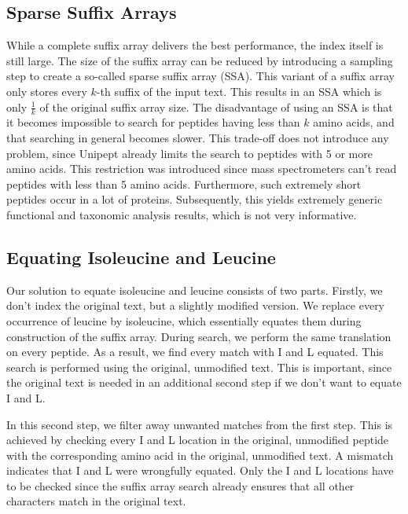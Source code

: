 \documentclass[11pt]{article}
\begin{document}
\begin{multicols}{2}
        \subsection{Sparse Suffix Arrays}
        While a complete suffix array delivers the best performance, the index itself is still large.
        The size of the suffix array can be reduced by introducing a sampling step to create a so-called sparse suffix array (SSA).
        This variant of a suffix array only stores every $k$-th suffix of the input text.
        This results in an SSA which is only $\frac{1}{k}$ of the original suffix array size.
        The disadvantage of using an SSA is that it becomes impossible to search for peptides having less than $k$ amino acids, and that searching in general becomes slower.
        This trade-off does not introduce any problem, since Unipept already limits the search to peptides with 5 or more amino acids.
        This restriction was introduced since mass spectrometers can't read peptides with less than 5 amino acids.
        Furthermore, such extremely short peptides occur in a lot of proteins.
        Subsequently, this yields extremely generic functional and taxonomic analysis results, which is not very informative.

        \subsection{Equating Isoleucine and Leucine}
        Our solution to equate isoleucine and leucine consists of two parts.
        Firstly, we don't index the original text, but a slightly modified version.
        We replace every occurrence of leucine by isoleucine, which essentially equates them during construction of the suffix array.
        During search, we perform the same translation on every peptide.
        As a result, we find every match with I and L equated.
        This search is performed using the original, unmodified text.
        This is important, since the original text is needed in an additional second step if we don't want to equate I and L\@.

        In this second step, we filter away unwanted matches from the first step.
        This is achieved by checking every I and L location in the original, unmodified peptide with the corresponding amino acid in the original, unmodified text.
        A mismatch indicates that I and L were wrongfully equated.
        Only the I and L locations have to be checked since the suffix array search already ensures that all other characters match in the original text.


\end{multicols}
\end{document}
